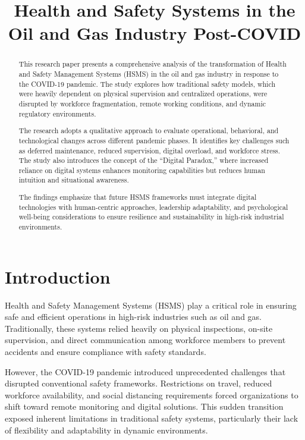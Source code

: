 \documentclass[conference]{IEEEtran}
\title{Health and Safety Systems in the Oil and Gas Industry Post-COVID}
\author{
\IEEEauthorblockN{Osheen, Manu Garg}
\IEEEauthorblockA{
Chitkara University, Punjab, India\\
}
}
\begin{document}
\maketitle

\begin{abstract}
This research paper presents a comprehensive analysis of the transformation of Health and Safety Management Systems (HSMS) in the oil and gas industry in response to the COVID-19 pandemic. The study explores how traditional safety models, which were heavily dependent on physical supervision and centralized operations, were disrupted by workforce fragmentation, remote working conditions, and dynamic regulatory environments.

The research adopts a qualitative approach to evaluate operational, behavioral, and technological changes across different pandemic phases. It identifies key challenges such as deferred maintenance, reduced supervision, digital overload, and workforce stress. The study also introduces the concept of the ``Digital Paradox,'' where increased reliance on digital systems enhances monitoring capabilities but reduces human intuition and situational awareness.

The findings emphasize that future HSMS frameworks must integrate digital technologies with human-centric approaches, leadership adaptability, and psychological well-being considerations to ensure resilience and sustainability in high-risk industrial environments.
\end{abstract}

\section{Introduction}

Health and Safety Management Systems (HSMS) play a critical role in ensuring safe and efficient operations in high-risk industries such as oil and gas. Traditionally, these systems relied heavily on physical inspections, on-site supervision, and direct communication among workforce members to prevent accidents and ensure compliance with safety standards.

However, the COVID-19 pandemic introduced unprecedented challenges that disrupted conventional safety frameworks. Restrictions on travel, reduced workforce availability, and social distancing requirements forced organizations to shift toward remote monitoring and digital solutions. This sudden transition exposed inherent limitations in traditional safety systems, particularly their lack of flexibility and adaptability in dynamic environments.
\end{document}
